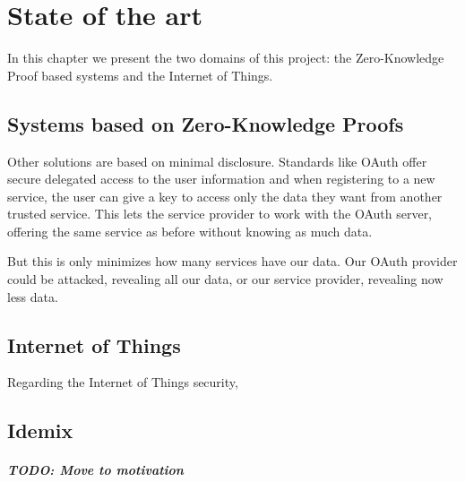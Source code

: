 \chapter{State of the art}\label{ch:stateoftheart}

In this chapter we present the two domains of this project: the Zero-Knowledge Proof based systems and the Internet of Things.


\section{Systems based on Zero-Knowledge Proofs}

Other solutions are based on minimal disclosure. Standards like OAuth offer secure delegated access to the user information and when registering to a new service, the user can give a key to access only the data they want from another trusted service. This lets the service provider to work with the OAuth server, offering the same service as before without knowing as much data.

But this is only minimizes how many services have our data. Our OAuth provider could be attacked, revealing all our data, or our service provider, revealing now less data.


\section{Internet of Things}


Regarding the Internet of Things security, 


\section{Idemix}

\paragraph{TODO: Move to motivation}

